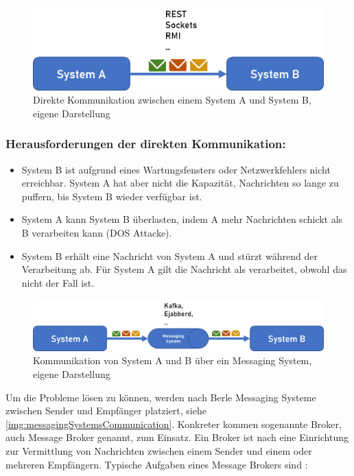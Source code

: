 \documentclass[a4paper,titlepage,halfparskip,12pt]{scrreprt}
\begin{document}
\begin{onehalfspacing}
\begin{figure}[h]
	\centering
	\includegraphics[width=.8\linewidth]{images/directCommunication}
	\caption{Direkte Kommunikation zwischen einem System A und System B, eigene Darstellung}
	\label{img:directCommunication}
\end{figure}

\subsubsection*{Herausforderungen der direkten Kommunikation\cite{berleKafkaOverview}:}

\begin{itemize}
\item System B ist aufgrund eines Wartungsfensters oder Netzwerkfehlers nicht erreichbar. System A hat aber nicht die Kapazität, Nachrichten so lange zu puffern, bis System B wieder verfügbar ist.
\item System A kann System B überlasten, indem A mehr Nachrichten schickt als B verarbeiten kann (\ac{DOS} Attacke).
\item System B erhält eine Nachricht von System A und stürzt während der Verarbeitung ab. Für System A gilt die Nachricht als verarbeitet, obwohl das nicht der Fall ist.
\end{itemize}

\begin{figure}[h]
	\centering
	\includegraphics[width=\linewidth]{images/messagingSystemsCommunication}
	\caption{Kommunikation von System A und B über ein Messaging System, eigene Darstellung}
	\label{img:messagingSystemsCommunication}
\end{figure}

\pagebreak

Um die Probleme lösen zu können, werden nach Berle Messaging Systeme zwischen Sender und Empfänger platziert, siehe \autoref{img:messagingSystemsCommunication}. Konkreter kommen sogenannte Broker, auch Message Broker genannt, zum Einsatz. Ein Broker ist nach \cite{kimmerBroker} eine Einrichtung zur Vermittlung von Nachrichten zwischen einem Sender und einem oder mehreren Empfängern. Typische Aufgaben eines Message Brokers sind \cite{kimmerBroker}:


\end{onehalfspacing}
\end{document}
